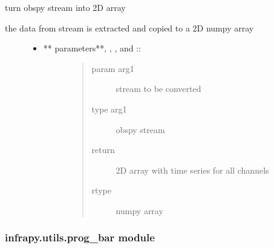 \documentclass[letterpaper,10pt,english]{sphinxmanual}
\begin{document}
\begin{fulllineitems}
\label{\detokenize{infrapy.utils:infrapy.utils.obspy_conversion.stream2array}}
turn obspy stream into 2D array
\begin{description}
\item[{the data from stream is extracted and copied to a 2D numpy array}] \leavevmode\begin{itemize}
\item {} \begin{description}
\item[{** parameters**, , , and ::}] \leavevmode\begin{quote}\begin{description}
\item[{param arg1}] \leavevmode
stream to be converted

\item[{type arg1}] \leavevmode
obspy stream

\item[{return}] \leavevmode
2D array with time series for all channels

\item[{rtype}] \leavevmode
numpy array

\end{description}\end{quote}

\end{description}

\end{itemize}

\end{description}

\end{fulllineitems}



\subsubsection{infrapy.utils.prog\_bar module}
\label{\detokenize{infrapy.utils:module-infrapy.utils.prog_bar}}\label{\detokenize{infrapy.utils:infrapy-utils-prog-bar-module}}
\end{document}

